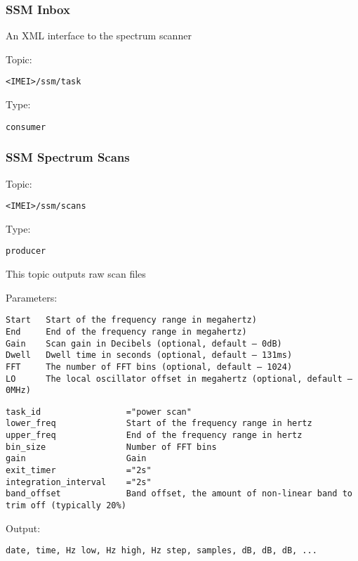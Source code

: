 \subsubsection{SSM Inbox}

An XML interface to the spectrum scanner
    
Topic:
\begin{lstlisting}<IMEI>/ssm/task\end{lstlisting}
Type:
\begin{lstlisting}consumer\end{lstlisting}

\subsubsection{SSM Spectrum Scans}

Topic:
\begin{lstlisting}<IMEI>/ssm/scans\end{lstlisting}
Type:
\begin{lstlisting}producer\end{lstlisting}
    
This topic outputs raw scan files

Parameters:
\begin{lstlisting}
Start   Start of the frequency range in megahertz)
End     End of the frequency range in megahertz)
Gain    Scan gain in Decibels (optional, default – 0dB)
Dwell   Dwell time in seconds (optional, default – 131ms)
FFT     The number of FFT bins (optional, default – 1024)
LO      The local oscillator offset in megahertz (optional, default – 0MHz)
\end{lstlisting}

\begin{lstlisting}
task_id                 ="power scan"
lower_freq              Start of the frequency range in hertz
upper_freq              End of the frequency range in hertz
bin_size                Number of FFT bins
gain                    Gain
exit_timer              ="2s"
integration_interval    ="2s"
band_offset             Band offset, the amount of non-linear band to trim off (typically 20%)
\end{lstlisting}

Output:
\begin{lstlisting}date, time, Hz low, Hz high, Hz step, samples, dB, dB, dB, ...\end{lstlisting}

